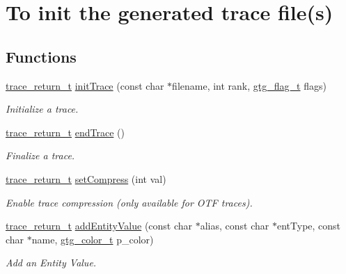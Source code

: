 \hypertarget{group__init}{\section{To init the generated trace file(s)}
\label{group__init}
}
\subsection*{Functions}
\begin{DoxyCompactItemize}
\item 
\hyperlink{group__type_ga1f1b68fb37d7331f03a48ef0993a0788}{trace\-\_\-return\-\_\-t} \hyperlink{group__init_ga6900cde464f9833ad682d680a2a78203}{init\-Trace} (const char $\ast$filename, int rank, \hyperlink{GTGBasic_8h_a7a5d407dd23dfced8b5937332ff80972}{gtg\-\_\-flag\-\_\-t} flags)
\begin{DoxyCompactList}\small\item\em Initialize a trace. \end{DoxyCompactList}\item 
\hyperlink{group__type_ga1f1b68fb37d7331f03a48ef0993a0788}{trace\-\_\-return\-\_\-t} \hyperlink{group__init_gabe4753689dfd8508c336b3898b0df471}{end\-Trace} ()
\begin{DoxyCompactList}\small\item\em Finalize a trace. \end{DoxyCompactList}\item 
\hyperlink{group__type_ga1f1b68fb37d7331f03a48ef0993a0788}{trace\-\_\-return\-\_\-t} \hyperlink{group__init_ga9219b49891d7bfce610daf60c5a02cae}{set\-Compress} (int val)
\begin{DoxyCompactList}\small\item\em Enable trace compression (only available for O\-T\-F traces). \end{DoxyCompactList}\item 
\hyperlink{group__type_ga1f1b68fb37d7331f03a48ef0993a0788}{trace\-\_\-return\-\_\-t} \hyperlink{group__init_gaa732419a54e774f325188e1b1f8ac36d}{add\-Entity\-Value} (const char $\ast$alias, const char $\ast$ent\-Type, const char $\ast$name, \hyperlink{GTGColor_8h_a7d118edf2d6e2588a0323079259fb0d6}{gtg\-\_\-color\-\_\-t} p\-\_\-color)
\begin{DoxyCompactList}\small\item\em Add an Entity Value. \end{DoxyCompactList}\end{DoxyCompactItemize}


